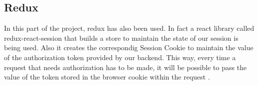 \documentclass[./main.tex]{subfiles}
\begin{document}
\subsection{Redux}
In this part of the project, redux has also been used. In fact a react library
called redux-react-session that builds a store to maintain the state of our session is being used.
Also it creates the correspondig Session Cookie to maintain the value of the authorization token
provided by our backend. This way, every time a request that needs authorization has to be made,
it will be possible to pass the value of the token stored in the browser cookie within the request .
\end{document}
